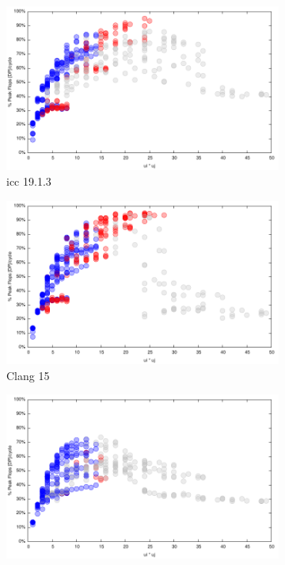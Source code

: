 \documentclass{article}
\begin{document}
\begin{figure}[h!]
  \begin{subfigure}[h]{0.45\textwidth}  
\includegraphics[width=\textwidth]{../benches/gemm/cascadelake-64x256x64/icc-19.1.3p.pdf}
  \caption{icc 19.1.3}
  \end{subfigure}
  \begin{subfigure}[h]{0.45\textwidth}  
\includegraphics[width=\textwidth]{../benches/gemm/cascadelake-64x256x64/greedyp.pdf}
  \caption{Clang 15}
  \end{subfigure}
  \begin{subfigure}[h]{0.45\textwidth}  
\includegraphics[width=\textwidth]{../benches/gemm/cascadelake-64x256x64/gcc-11.9p.pdf}

\end{subfigure}
\end{figure}
\end{document}
